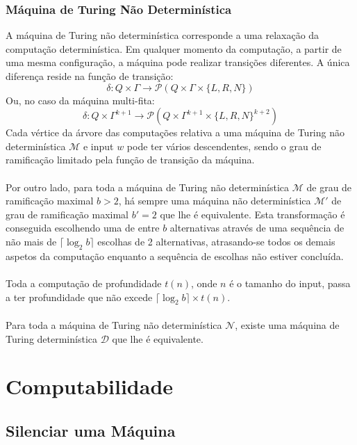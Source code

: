 \documentclass[10pt,a4paper]{report}
\begin{document}
\subsection{Máquina de Turing Não Determinística}
A máquina de Turing não determinística corresponde a uma relaxação da computação determinística. Em qualquer momento da computação, a partir de uma mesma configuração, a máquina pode realizar transições diferentes. A única diferença reside na função de transição:
$$
\delta: Q \times \Gamma \rightarrow \mathcal{P}(Q \times \Gamma \times\{L,R,N\})
$$
Ou, no caso da máquina multi-fita:
$$
\delta: Q \times \Gamma^{k+1} \rightarrow \mathcal{P}(Q \times \Gamma^{k+1} \times\{L,R,N\}^{k+2})
$$
Cada vértice da árvore das computações relativa a uma máquina de Turing não determinística $\mathcal{M}$ e input $w$ pode ter vários descendentes, sendo o grau de ramificação limitado pela função de transição da máquina.\\
\\
Por outro lado, para toda a máquina de Turing não determinística $\mathcal{M}$ de grau de ramificação maximal $b > 2$, há sempre uma máquina não determinística $\mathcal{M}'$ de grau de ramificação maximal $b' = 2$ que lhe é equivalente. Esta transformação é conseguida escolhendo uma de entre $b$ alternativas através de uma sequência de não mais de $\lceil \log_2 b \rceil$ escolhas de 2 alternativas, atrasando-se todos os demais aspetos da computação enquanto a sequência de escolhas não estiver concluída.\\
\\
Toda a computação de profundidade $t(n)$, onde $n$ é o tamanho do input, passa a ter profundidade que não excede $\lceil \log_2 b \rceil \times t(n)$.\\
\\
Para toda a máquina de Turing não determinística $\mathcal{N}$, existe uma máquina de Turing determinística $\mathcal{D}$ que lhe é equivalente.

\chapter{Computabilidade}
\section{Silenciar uma Máquina}
\end{document}
